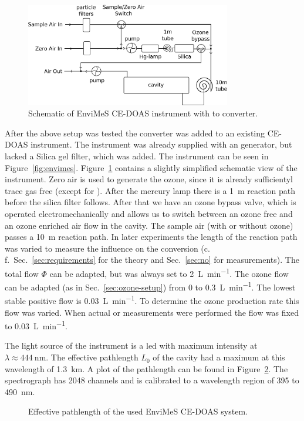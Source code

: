 \begin{figure}[htbp]
  \centering
  \includegraphics[width=0.8\textwidth]{images/envimes_setup.eps}
  \caption{Schematic of EnviMeS CE-DOAS instrument with  to
     converter.}
  \label{fig:envimes-schematic}
\end{figure}

After the above setup was tested the converter was added to an
existing CE-DOAS instrument. The instrument was already supplied with
an  generator, but lacked a Silica gel filter, which was
added. The instrument can be seen in
Figure~\ref{fig:envimes}. Figure~\ref{fig:envimes-schematic} contains
a slightly simplified schematic view of the instrument. Zero air is
used to generate the ozone, since it is already sufficientyl trace gas
free (except for ). After the mercury lamp there is a
\SI{1}{\meter} reaction path before the silica filter follows. After
that we have an ozone bypass valve, which is operated
electromechanically and allows us to switch between an ozone free and
an ozone enriched air flow in the cavity. The sample air (with or
without ozone) passes a \SI{10}{\meter} reaction path. In later
experiments the length of the reaction path was varied to measure the
influence on the  conversion (c.\,f.\
Sec.~\ref{sec:requirements} for the theory and Sec.~\ref{sec:no} for
measurements). The total flow $\Phi$ can be adapted, but was always
set to \SI{2}{\liter\per\minute}. The ozone flow can be adapted (as
in Sec.~\ref{sec:ozone-setup}) from 0 to
\SI{0.3}{\liter\per\minute}. The lowest stable positive flow is
\SI{0.03}{\liter\per\minute}. To determine the ozone production rate
this flow was varied. When actual \ch{NO} or \ch{NO_x} measurements
were performed the flow was fixed to \SI{0.03}{\liter\per\minute}.

The light source of the instrument is a led with maximum intensity at
$\lambda \approx \SI{444}{\nano\meter}$. The effective pathlength
$L_0$ of the cavity had a maximum at this wavelength of
\SI{1.3}{\kilo\meter}. A plot of the pathlength can be found in
Figure~\ref{fig:pathlength}. The spectrograph has \num{2048} channels
and is calibrated to a wavelength region of \num{395} to
\SI{490}{\nano\meter}.

\begin{figure}[htbp]
  \centering
  
  \caption{Effective pathlength of the used EnviMeS CE-DOAS system.}
  \label{fig:pathlength}
\end{figure}

